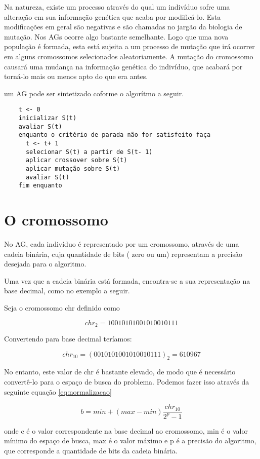 \documentclass[
    12pt,               %
    twoside,            %
    a4paper,            %
    english,            %
    french,             %
    spanish,            %
    brazil,             %
    ]{abntex2}
\begin{document}
  Na natureza, existe um processo através do qual um indivíduo sofre uma alteração em sua informação genética que acaba por modificá-lo. Esta modificações em geral são negativas e são chamadas no jargão da biologia de mutação. Nos AGs ocorre algo bastante semelhante. Logo que uma nova população é formada, esta está sujeita a um processo de mutação que irá ocorrer em alguns cromossomos selecionados aleatoriamente. A mutação do cromossomo causará uma mudança na informação genética do indivíduo, que acabará por torná-lo mais ou menos apto do que era antes.

  um AG pode ser sintetizado coforme o algorítmo a seguir.

  \begin{verbatim}
    t <- 0
    inicializar S(t)
    avaliar S(t)
    enquanto o critério de parada não for satisfeito faça
      t <- t+ 1
      selecionar S(t) a partir de S(t- 1)
      aplicar crossover sobre S(t)
      aplicar mutação sobre S(t)
      avaliar S(t)
    fim enquanto
  \end{verbatim}

\section{O cromossomo}

  No AG, cada indivíduo é representado por um cromossomo, através de uma cadeia binária, cuja quantidade de bits ( zero ou um) representam a precisão desejada para o algoritmo.

  Uma vez que a cadeia binária está formada, encontra-se a sua representação na base decimal, como no exemplo a seguir.

  Seja o cromossomo chr definido como

  $$chr_2 = 10010101001010010111$$

  Convertendo para base decimal teríamos:

  $$chr_{10} = (0010101001010010111)_2 = 610967$$

  No entanto, este valor de chr é bastante elevado, de modo que é necessário convertê-lo para o espaço de busca do problema. Podemos fazer isso através da seguinte equação \ref{eq:normalizacao}

  \begin{equation}
    b = min + (max - min) \frac{chr_{10}}{2^p -1}
    \label{eq:normalizacao}
  \end{equation}
  

  onde c é o valor correspondente na base decimal ao cromossomo, min é o valor mínimo do espaço de busca, max é o valor máximo e p é a precisão do algoritmo, que corresponde a quantidade de bits da cadeia binária.
\end{document}
